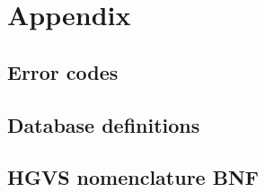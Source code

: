 \documentclass{article}
\begin{document}
\section{Appendix}

\subsection{Error codes} \label{subsec:error}


\subsection{Database definitions} \label{subsec:dbtables}


\subsection{HGVS nomenclature BNF} \label{subsec:bnf}


\newpage

{}

\end{document}
